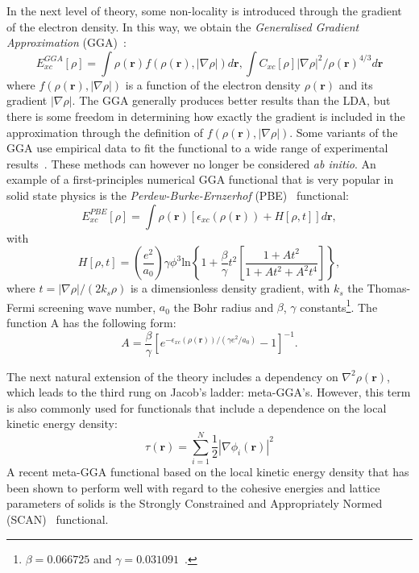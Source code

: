 \begin{refsection}
In the next level of theory, some non-locality is introduced through the 
gradient of the electron density. In this way, we obtain the 
\textit{Generalised Gradient Approximation} (GGA)~\cite{Perdew1992}: 
\begin{equation} 
E_{xc}^{GGA}[\rho] = \int \rho(\mathbf{r}) f(\rho(\mathbf{r}),\left| \nabla 
\rho\right|)d\mathbf{r}, 
\int C_{xc} [\rho] \left| \nabla \rho\right|^2 / \rho(\mathbf{r})^{4/3} 
d\mathbf{r} 
\end{equation} 
where $f(\rho(\mathbf{r}),\left| \nabla \rho\right|)$ is a function of the 
electron density $\rho(\mathbf{r})$ and its gradient $\left| \nabla 
\rho\right|$. The GGA generally produces better results than the LDA, but 
there is some freedom in determining how exactly the gradient is included in 
the approximation through the definition of $f(\rho(\mathbf{r}),\left| \nabla 
\rho\right|)$. Some variants of the GGA use empirical data to fit the 
functional to a wide range of experimental results~\cite{Becke1988, Keal2004}. These methods can however 
no longer be considered \textit{ab initio}. An example of a first-principles 
numerical GGA functional that is very popular in solid state physics is the 
\textit{Perdew-Burke-Ernzerhof} (PBE)~\cite{Perdew1996} functional: 
\begin{equation} 
E_{xc}^{PBE}[\rho] = \int \rho(\mathbf{r}) \left[ 
\epsilon_{xc}(\rho(\mathbf{r})) + H[\rho,t] \right] d\mathbf{r}, 
\end{equation} 
with 
\begin{equation} 
H[\rho,t] = \left( \frac{e^2}{a_0} \right) \gamma \phi^3 \text{ln} \left\{ 1 + 
\frac{\beta}{\gamma} t^2 \left[ \frac{1 + A t^2}{1 + A t^2 + A^2 t^4} \right] 
\right\}, 
\end{equation} 
where $t = \left| \nabla \rho \right|/(2 k_s\rho)$ is a dimensionless density 
gradient, with $k_s$ the Thomas-Fermi screening wave number, $a_0$ the Bohr 
radius and $\beta$, $\gamma$ constants\footnote{$\beta = 0.066725$ and $\gamma 
= 0.031091$~\cite{Kohanoff2006}.}. The function A has the following form: 
\begin{equation} 
A = \frac{\beta}{\gamma} \left[ e^{-\epsilon_{xc}(\rho(\mathbf{r}))/(\gamma 
e^2 /a_0)} - 1 \right]^{-1}. 
\end{equation} 
 
The next natural extension of the theory includes a dependency on $\nabla^2 
\rho(\mathbf{r})$, which leads to the third rung on Jacob's ladder: 
meta-GGA's. However, this term is also commonly used for functionals that 
include a dependence on the local kinetic energy density: 
\begin{equation} 
\tau (\mathbf{r}) = \sum_{i=1}^N \frac{1}{2} \left| \nabla \phi_i (\mathbf{r}) 
\right|^2 
\end{equation} 
A recent meta-GGA functional based on the local kinetic energy density that 
has been shown to perform well with regard to the cohesive energies and 
lattice parameters of solids is the Strongly Constrained and Appropriately 
Normed (SCAN)~\cite{Sun2015} functional. 
 

\end{refsection}
